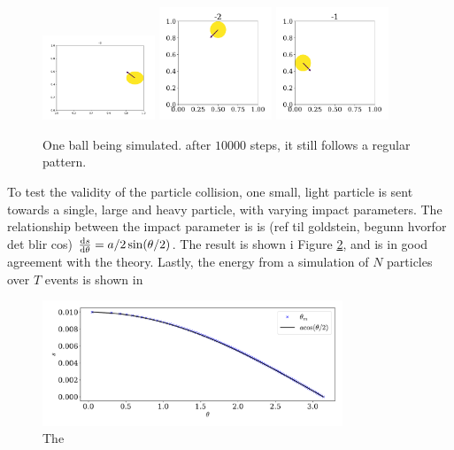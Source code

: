 \documentclass{article}
\begin{document}
        \begin{figure}
            \centering
            \includegraphics[width=0.3\textwidth]{../plots/test_case_one_particle/particle-3.pdf}
            \includegraphics[width=0.3\textwidth]{../plots/test_case_one_particle/particle-2.pdf}
            \includegraphics[width=0.3\textwidth]{../plots/test_case_one_particle/particle-1.pdf}
            \caption{One ball being simulated. after $10 000$ steps, it still follows a regular pattern.}
            \label{single particle}
        \end{figure}
        
        To test the validity of the particle collision, one small, light particle is sent towards a single, large and heavy particle, with varying impact parameters. The relationship between the impact parameter is is (ref til goldstein, begunn hvorfor det blir cos) $\dv{s}{\theta} = a / 2 \sin(\theta / 2)$. The result is shown i Figure \ref{scattering}, and is in good agreement with the theory. Lastly, the energy from a simulation of $N$ particles over $T$ events is shown in


        \begin{figure}
            \centering
            \includegraphics[width=0.8\textwidth]{../plots/test_case_collision_angle/collision_angle.pdf}
            \caption{The }
            \label{scattering}
        \end{figure}
\end{document}
